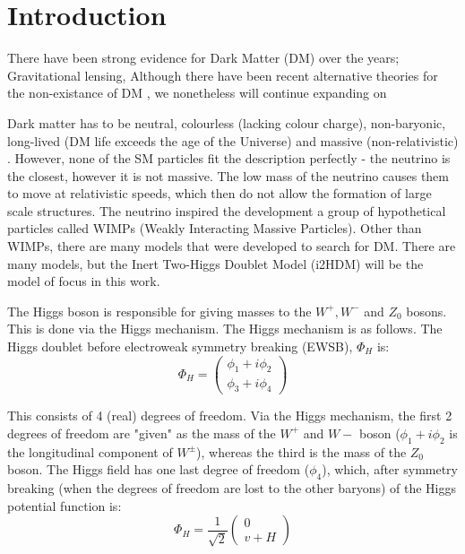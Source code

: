 \documentclass[12pt]{article}
\begin{document}
\newpage
\twocolumn

\onehalfspacing
\setcounter{page}{1}
\section{Introduction}
\label{sec:introduction}
There have been strong evidence for Dark Matter (DM) over the years; Gravitational lensing, %
Although there have been recent alternative theories for the non-existance of DM \cite{Gupta_2023, Gupta_2024}, we nonetheless will continue expanding on 

Dark matter has to be neutral, colourless (lacking colour charge), non-baryonic, long-lived (DM life exceeds the age of the Universe) and massive (non-relativistic) \cite{ZACEK_2007, DeLuca2018, gondolo2004introductionnonbaryonicdarkmatter}. However, none of the SM particles fit the description perfectly - the neutrino is the closest, however it is not massive. The low mass of the neutrino causes them to move at relativistic speeds, which then do not allow the formation of large scale structures. The neutrino inspired the development a group of hypothetical particles called WIMPs (Weakly Interacting Massive Particles). Other than WIMPs, there are many models that were developed to search for DM. There are many models, but the Inert Two-Higgs Doublet Model (i2HDM) will be the model of focus in this work. 

The Higgs boson is responsible for giving masses to the $W^+, W^-$ and $Z_0$ bosons. This is done via the Higgs mechanism. The Higgs mechanism is as follows.
The Higgs doublet before electroweak symmetry breaking (EWSB), $\Phi_H$ is:
\begin{equation}
    \Phi_H =
    \begin{pmatrix}
        {\phi_1 + i\phi_2} \\
        {\phi_3 + i\phi_4}
    \end{pmatrix}
\end{equation}

This consists of 4 (real) degrees of freedom. Via the Higgs mechanism, the first 2 degrees of freedom are "given" as the mass of the $W^+$ and $W-$ boson ($\phi_1 + i\phi_2$ is the longitudinal component of $W^\pm$), whereas the third is the mass of the $Z_0$ boson. The Higgs field has one last degree of freedom ($\phi_4$), which, after symmetry breaking (when the degrees of freedom are lost to the other baryons) of the Higgs potential function is: 
\begin{equation}
    \Phi_H = \frac{1}{\sqrt{2}}
    \begin{pmatrix}
        {0} \\
        {v + H}
    \end{pmatrix}
\end{equation}
\end{document}
